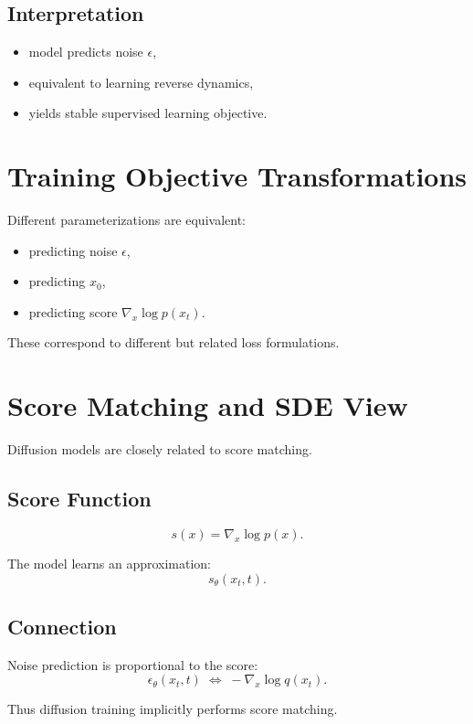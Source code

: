 \subsection{Interpretation}

\begin{itemize}
    \item model predicts noise $\epsilon$,
    \item equivalent to learning reverse dynamics,
    \item yields stable supervised learning objective.
\end{itemize}

\section{Training Objective Transformations}

Different parameterizations are equivalent:

\begin{itemize}
    \item predicting noise $\epsilon$,
    \item predicting $x_0$,
    \item predicting score $\nabla_x \log p(x_t)$.
\end{itemize}

These correspond to different but related loss formulations.

\section{Score Matching and SDE View}

Diffusion models are closely related to score matching.

\subsection{Score Function}

\[
s(x) = \nabla_x \log p(x).
\]

The model learns an approximation:
\[
s_\theta(x_t, t).
\]

\subsection{Connection}

Noise prediction is proportional to the score:
\[
\epsilon_\theta(x_t,t) \;\Longleftrightarrow\; -\nabla_x \log q(x_t).
\]

Thus diffusion training implicitly performs score matching.

